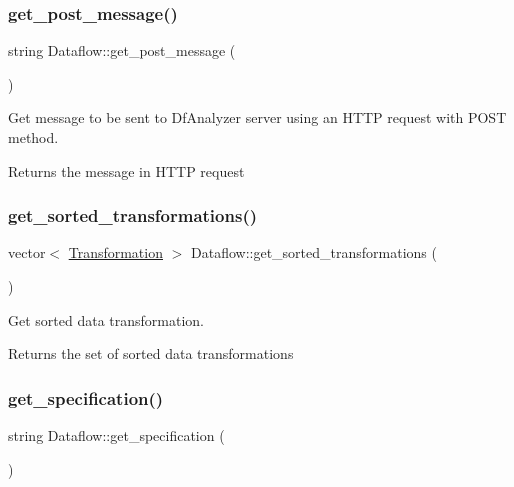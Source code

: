 \subsubsection{\texorpdfstring{get\+\_\+post\+\_\+message()}{get\_post\_message()}}
{\footnotesize\ttfamily string Dataflow\+::get\+\_\+post\+\_\+message (\begin{DoxyParamCaption}{ }\end{DoxyParamCaption})\hspace{0.3cm}{\ttfamily [protected]}}

Get message to be sent to Df\+Analyzer server using an H\+T\+TP request with P\+O\+ST method. \begin{DoxyReturn}{Returns}
the message in H\+T\+TP request 
\end{DoxyReturn}
\mbox{\label{classDataflow_a947b0d9382901eb90277f648b40f6946}} 
\subsubsection{\texorpdfstring{get\+\_\+sorted\+\_\+transformations()}{get\_sorted\_transformations()}}
{\footnotesize\ttfamily vector$<$ \hyperlink{classTransformation}{Transformation} $>$ Dataflow\+::get\+\_\+sorted\+\_\+transformations (\begin{DoxyParamCaption}{ }\end{DoxyParamCaption})}

Get sorted data transformation. \begin{DoxyReturn}{Returns}
the set of sorted data transformations 
\end{DoxyReturn}
\mbox{\label{classDataflow_aa1023af477da09f5dcb63b048e19692e}} 
\subsubsection{\texorpdfstring{get\+\_\+specification()}{get\_specification()}}
{\footnotesize\ttfamily string Dataflow\+::get\+\_\+specification (\begin{DoxyParamCaption}{ }\end{DoxyParamCaption})}

